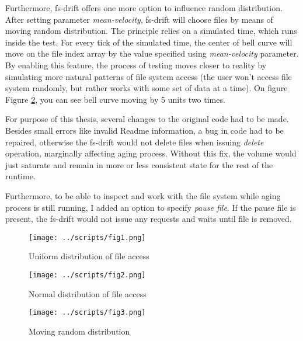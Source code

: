 \documentclass[
  color, %
  table, %
  lof,   %
  lot,   %
]{fithesis3}
\begin{document}
Furthermore, fs-drift offers one more option to influence random distribution. After setting parameter \textit{mean-velocity}, fs-drift will choose files by means of moving random distribution. The principle relies on a simulated time, which runs inside the test. For every tick of the simulated time, the center of bell curve will move on the file index array by the value specified using \textit{mean-velocity} parameter. By enabling this feature, the process of testing moves closer to reality by simulating more natural patterns of file system access (the user won't access file system randomly, but rather works with some set of data at a time). On figure Figure \ref{fig:rand3}, you can see bell curve moving by 5 units two times.

For purpose of this thesis, several changes to the original code had to be made. Besides small errors like invalid Readme information, a bug in code had to be repaired, otherwise the fs-drift would not delete files when issuing \textit{delete} operation, marginally affecting aging process. Without this fix, the volume would just saturate and remain in more or less consistent state for the rest of the runtime.

Furthermore, to be able to inspect and work with the file system while aging process is still running, I added an option to specify \textit{pause file}. If the pause file is present, the fs-drift would not issue any requests and waits until file is removed.

\begin{figure}[!htb]
    \centering
    \begin{minipage}{\textwidth}
        \centering
        \texttt{[image: ../scripts/fig1.png]}
        \caption{Uniform distribution of file access}
\label{fig:rand1}
    \end{minipage}\hfill
    \begin{minipage}{\textwidth}
        \centering
        \texttt{[image: ../scripts/fig2.png]}
        \caption{Normal distribution of file access}

\label{fig:rand2}
    \end{minipage}

\end{figure}
\begin{figure}
    \begin{minipage}{\textwidth}
        \centering
        \texttt{[image: ../scripts/fig3.png]}
        \caption{Moving random distribution}
\label{fig:rand3}
    \end{minipage}
\end{figure}
\end{document}
